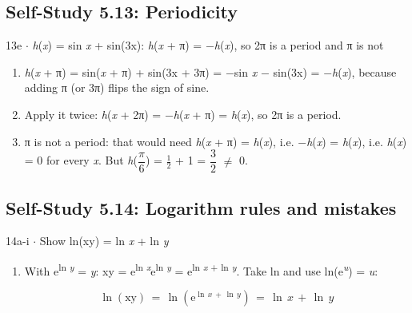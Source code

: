 \documentclass[11pt]{article}
\begin{document}
\begin{keepsection}\subsection{Self-Study 5.13: Periodicity}

\begin{workedbox}{13e \ensuremath{\cdot} \textit{h}(\textit{x}) = sin \textit{x} + sin(3x): \textit{h}(\textit{x} + π) = \ensuremath{-}\textit{h}(\textit{x}), so 2π is a period and π is not}
\begin{enumerate}
\item \textit{h}(\textit{x} + π) = sin(\textit{x} + π) + sin(3x + 3π) = \ensuremath{-}sin \textit{x} \ensuremath{-} sin(3x) = \ensuremath{-}\textit{h}(\textit{x}), because adding π (or 3π) flips the sign of sine.
\item Apply it twice: \textit{h}(\textit{x} + 2π) = \ensuremath{-}\textit{h}(\textit{x} + π) = \textit{h}(\textit{x}), so 2π is a period.
\item π is not a period: that would need \textit{h}(\textit{x} + π) = \textit{h}(\textit{x}), i.e. \ensuremath{-}\textit{h}(\textit{x}) = \textit{h}(\textit{x}), i.e. \textit{h}(\textit{x}) = 0 for every \textit{x}. But \textit{h}({\small\ensuremath{\dfrac{π}{6}}}) = \ensuremath{\tfrac12} + 1 = {\small\ensuremath{\dfrac{3}{2}}} \ensuremath{\neq} 0.
\end{enumerate}
\end{workedbox}

\end{keepsection}
\begin{keepsection}\subsection{Self-Study 5.14: Logarithm rules and mistakes}

\begin{workedbox}{14a-i \ensuremath{\cdot} Show ln(xy) = ln \textit{x} + ln \textit{y}}
\begin{enumerate}
\item {}
With e\textsuperscript{ln \textit{y}} = \textit{y}: xy = e\textsuperscript{ln \textit{x}}e\textsuperscript{ln \textit{y}} = e\textsuperscript{ln \textit{x} + ln \textit{y}}. Take ln and use ln(e\textsuperscript{\textit{u}}) = \textit{u}:

\begin{equation*}\ln (\text{xy})\, =\, \ln (\mathrm{e}^{\ln \, {x}\, +\, \ln \, {y}})\, =\, \ln \, {x}\, +\, \ln \, {y}\end{equation*}
\end{enumerate}
\end{workedbox}

\end{keepsection}
\end{document}
